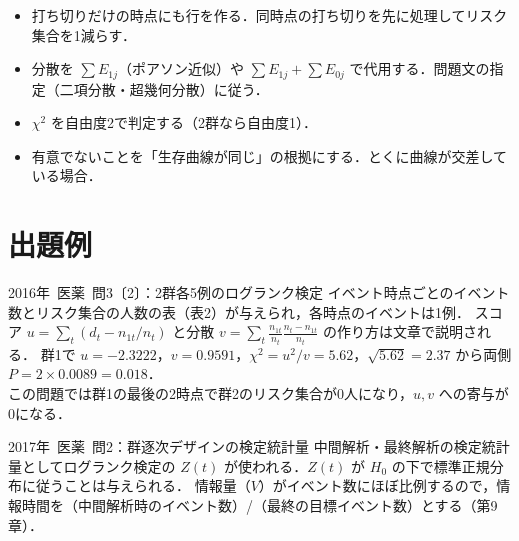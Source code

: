 \documentclass[a4paper,11pt,openany]{ltjsbook}
\newcommand{\kakomon}[2]{\mbox{#1年 医薬 問#2}}
\begin{document}
\begin{warnbox}
\begin{itemize}
\item 打ち切りだけの時点にも行を作る．同時点の打ち切りを先に処理してリスク集合を1減らす．
\item 分散を $\sum E_{1j}$（ポアソン近似）や $\sum E_{1j}+\sum E_{0j}$ で代用する．問題文の指定（二項分散・超幾何分散）に従う．
\item $\chi^2$ を自由度2で判定する（2群なら自由度1）．
\item 有意でないことを「生存曲線が同じ」の根拠にする．とくに曲線が交差している場合．
\end{itemize}
\end{warnbox}

\section{出題例}\label{sec:m02-shutsudai}
\begin{shutsudai}{\kakomon{2016}{3}〔2〕：2群各5例のログランク検定}
イベント時点ごとのイベント数とリスク集合の人数の表（表2）が与えられ，各時点のイベントは1例．
スコア $u=\sum_t(d_t-n_{1t}/n_t)$ と分散 $v=\sum_t\frac{n_{1t}}{n_t}\frac{n_t-n_{1t}}{n_t}$ の作り方は文章で説明される．
群1で $u=-2.3222$，$v=0.9591$，$\chi^2=u^2/v=5.62$，$\sqrt{5.62}=2.37$ から両側 $P=2\times0.0089=0.018$．\\
この問題では群1の最後の2時点で群2のリスク集合が0人になり，$u,v$ への寄与が0になる．
\end{shutsudai}
\begin{shutsudai}{\kakomon{2017}{2}：群逐次デザインの検定統計量}
中間解析・最終解析の検定統計量としてログランク検定の $Z(t)$ が使われる．$Z(t)$ が $H_0$ の下で標準正規分布に従うことは与えられる．
情報量（$V$）がイベント数にほぼ比例するので，情報時間を（中間解析時のイベント数）/（最終の目標イベント数）とする（第9章）．
\end{shutsudai}

\end{document}
